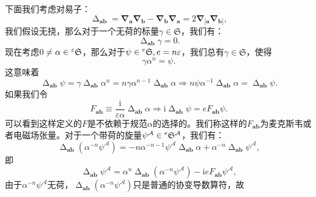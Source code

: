 下面我们考虑对易子：
\begin{equation*}
	\upDelta _{\boldsymbol{ab}} =\boldsymbol{\nabla }_{\boldsymbol{a}}\boldsymbol{\nabla }_{\boldsymbol{b}} -\boldsymbol{\nabla }_{\boldsymbol{b}}\boldsymbol{\nabla }_{\boldsymbol{a}} =2\boldsymbol{\nabla }_{[\boldsymbol{a}}\boldsymbol{\nabla }_{\boldsymbol{b}]} ,
\end{equation*}
我们假设无挠，那么对于一个无荷的标量$\gamma \in \mathfrak{S}$，我们有：
\begin{equation*}
	\upDelta _{\boldsymbol{ab}} \gamma =0.
\end{equation*}
现在考虑$0\neq \alpha \in \prescript{\varepsilon }{}{}\mathfrak{S}$，那么对于$\psi \in \prescript{e}{}{}\mathfrak{S} ,e=n\varepsilon $，我们总有$\gamma \in \mathfrak{S}$，使得
\begin{equation*}
	\gamma \alpha ^{n} =\psi .
\end{equation*}
这意味着
\begin{equation*}
	\upDelta _{\boldsymbol{ab}} \psi =\gamma \upDelta _{\boldsymbol{ab}} \alpha ^{n} =n\gamma \alpha ^{n-1} \upDelta _{\boldsymbol{ab}} \alpha \Rightarrow n\psi \alpha ^{-1} \upDelta _{\boldsymbol{ab}} \alpha =\upDelta _{\boldsymbol{ab}} \psi .
\end{equation*}
如果我们令
\begin{equation}
	F_{\boldsymbol{ab}} \equiv \frac{\mathrm{i}}{\varepsilon \alpha } \upDelta _{\boldsymbol{ab}} \alpha \Rightarrow \mathrm{i} \upDelta _{\boldsymbol{ab}} \psi =eF_{\boldsymbol{ab}} \psi .
	\label{eq:6.4}
\end{equation}
可以看到这样定义的$F$是不依赖于规范$\alpha $的选择的。我们称这样的$F_{\boldsymbol{ab}}$为麦克斯韦或者电磁场张量。对于一个带荷的旋量$\psi ^{\mathcal{A}} \in \prescript{e}{}{}\mathfrak{S}^{\mathcal{A}}$，我们有：
\begin{equation*}
	\upDelta _{\boldsymbol{ab}} (\alpha ^{-n} \psi ^{\mathcal{A}} )=-n\alpha ^{-n-1} \psi ^{\mathcal{A}} \upDelta _{\boldsymbol{ab}} \alpha +\alpha ^{-n} \upDelta _{\boldsymbol{ab}} \psi ^{\mathcal{A}} ,
\end{equation*}
即
\begin{equation}
	\upDelta _{\boldsymbol{ab}} \psi ^{\mathcal{A}} =\alpha ^{n} \upDelta _{\boldsymbol{ab}} (\alpha ^{-n} \psi ^{\mathcal{A}} )-\mathrm{i} eF_{\boldsymbol{ab}} \psi ^{\mathcal{A}} ,
	\label{eq:6.5}
\end{equation}
由于$\alpha ^{-n} \psi ^{\mathcal{A}}$无荷，$\upDelta _{\boldsymbol{ab}} (\alpha ^{-n} \psi ^{\mathcal{A}} )$只是普通的协变导数算符，故
